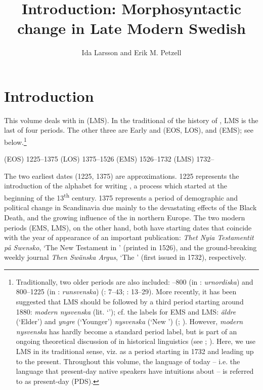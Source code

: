 \documentclass[output=paper]{langscibook}
\author{Ida Larsson\affiliation{Østfold University College, Halden} and Erik M. Petzell\affiliation{Institute for Language and Folklore, Gothenburg}}
\title{Introduction: Morphosyntactic change in Late Modern Swedish}
\begin{document}
\maketitle 



\section{Introduction}\label{sec:intro:1}


This volume deals with  in  (LMS). In the traditional  of the history of , LMS is the last of four periods. The other three are Early and  (EOS, LOS), and  (EMS); see  below.\footnote{Traditionally, two older periods are also included:  –800 (in : \textit{urnordiska}) and  800–1225 (in : \textit{runsvenska}) (\citealt{Wessen1958}: 7–43; \citealt{Bergman1968}: 13–29). More recently, it has been suggested that LMS should be followed by a third period starting around 1880: \textit{modern nysvenska} (lit. ‘’); cf. the  labels for EMS and LMS: \textit{äldre} (‘Elder’) and \textit{yngre} (‘Younger’) \textit{nysvenska} (‘New ’) (\citealt{Thelander1988}; \citealt{Malmgren2007}). However, \textit{modern nysvenska} has hardly become a standard period label, but is part of an ongoing theoretical discussion of  in  historical linguistics (see \citealt{Ralph2000}; \citealt{Johansson2007, Johansson2010}). Here, we use LMS in its traditional sense, viz. as a period starting in 1732 and leading up to the present. Throughout this volume, the language of today – i.e. the language that present-day native speakers have intuitions about – is referred to as present-day  (PDS).}


\ea \label{ex:intro:1}
\ea   {} (EOS) 1225–1375
\ex  {} (LOS) 1375–1526
\ex   {} (EMS) 1526–1732
\ex   {} (LMS) 1732–
\z
\z

The two earliest dates (1225, 1375) are approximations. 1225 represents the introduction of the  alphabet for writing , a process which started at the beginning of the 13\textsuperscript{th} century. 1375 represents a period of demographic and political change in Scandinavia due mainly to the devastating effects of the Black Death, and the growing influence of the  in northern Europe. The two modern periods (EMS, LMS), on the other hand, both have starting dates that coincide with the year of appearance of an important publication: \textit{Thet Nyia Testamentit på Swensko}, ‘The New Testament in ’ (printed in 1526), and the ground-breaking weekly journal \textit{Then Swänska Argus}, ‘The  ’ (first issued in 1732), respectively.
\end{document}
